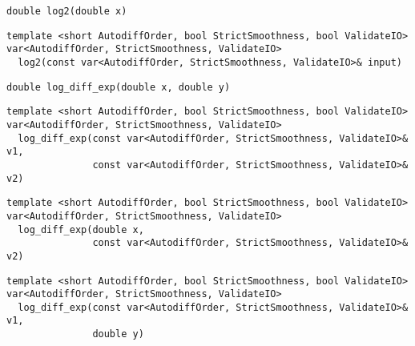\begin{tcolorbox}[colback=white,colframe=gray90, coltitle=black,boxrule=3pt,
fonttitle=\bfseries,title= Log2]

\begin{verbatim}
double log2(double x)

\end{verbatim}

\begin{verbatim}
template <short AutodiffOrder, bool StrictSmoothness, bool ValidateIO>
var<AutodiffOrder, StrictSmoothness, ValidateIO>
  log2(const var<AutodiffOrder, StrictSmoothness, ValidateIO>& input)

\end{verbatim}

\end{tcolorbox}

\begin{tcolorbox}[colback=white,colframe=gray90, coltitle=black,boxrule=3pt,
fonttitle=\bfseries,title= Log Diff Exp]

\begin{verbatim}
double log_diff_exp(double x, double y)

\end{verbatim}

\begin{verbatim}
template <short AutodiffOrder, bool StrictSmoothness, bool ValidateIO>
var<AutodiffOrder, StrictSmoothness, ValidateIO>
  log_diff_exp(const var<AutodiffOrder, StrictSmoothness, ValidateIO>& v1,
               const var<AutodiffOrder, StrictSmoothness, ValidateIO>& v2)

\end{verbatim}

\begin{verbatim}
template <short AutodiffOrder, bool StrictSmoothness, bool ValidateIO>
var<AutodiffOrder, StrictSmoothness, ValidateIO>
  log_diff_exp(double x,
               const var<AutodiffOrder, StrictSmoothness, ValidateIO>& v2)

\end{verbatim}

\begin{verbatim}
template <short AutodiffOrder, bool StrictSmoothness, bool ValidateIO>
var<AutodiffOrder, StrictSmoothness, ValidateIO>
  log_diff_exp(const var<AutodiffOrder, StrictSmoothness, ValidateIO>& v1,
               double y)

\end{verbatim}

\end{tcolorbox}

